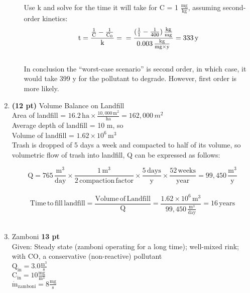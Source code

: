 \documentclass[12pt,letterpaper]{article}
\begin{document}
\begin{enumerate}
\begin{enumerate}
Use k and solve for the time it will take for C = 1 $\mathrm{\frac{mg}{kg}}$, assuming second-order kinetics:\\

\begin{equation*}
\mathrm{t = \frac{\frac{1}{C}-\frac{1}{C_0}}{k} =\\ =\frac{(\frac{1}{1}-\frac{1}{400})\, \frac{kg}{mg}}{0.003\, \frac{kg}{mg\times y}} = 333\, y}
\end{equation*}\\

In conclusion the ``worst-case scenario'' is second order, in which case, it would take 399 y for the pollutant to degrade.  However, first order is more likely.\\
\end{enumerate}
\vspace{0.2in}

\item \textbf{(12 pt)} Volume Balance on Landfill\\

Area of landfill = $\mathrm{16.2\,ha\times\frac{10,000\, m^2}{ha}} = 162,000\, m^2$\\

Average depth of landfill = 10 m, so\\

Volume of landfill = $\mathrm{1.62\times 10^{6}\, m^3}$\\

Trash is dropped of 5 days a week and compacted to half of its volume, so volumetric flow of trash into landfill, Q can be expressed as follows:

\begin{equation*}
\mathrm{Q = 765\, \frac{m^3}{day} \times \frac{1\,m^3}{2\, compaction\, factor}\times \frac{5\, days}{y}\times \frac{52\, weeks}{year} = 99,450 \, \frac{m^3}{y}}
\end{equation*}\\

\begin{equation*}
\mathrm{Time\, to\, fill\, landfill = \frac{Volume\, of\, Landfill}{Q} = \frac{1.62\times 10^{6}\, m^3}{99,450\, \frac{m^3}{day}} = 16\, years}
\end{equation*}\\

\vspace{0.2in}


\item Zamboni \textbf{13 pt}\\
Given:  Steady state (zamboni operating for a long time); well-mixed rink; with CO, a conservative (non-reactive) pollutant\\
$\mathrm{Q_{in} = 3.0 \frac{m^3}{s}}$\\
$\mathrm{C_{in} = 10 \frac{mg}{m^3}}$\\
$\mathrm{\dot{m}_{zamboni} = 8 \frac{mg}{s}}$\\


\end{enumerate}
\end{document}
